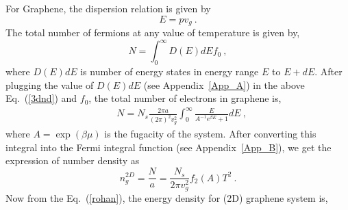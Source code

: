 \documentclass[amsmath,amssymb,aps,prb]{revtex4-2}
\begin{document}
    For Graphene, the dispersion relation is given by
    \begin{equation}
    E = pv_g~.
    \label{nanu}
    \end{equation}
    The total number of fermions at any value of temperature is given by,
    \begin{equation}
    N = \int_0^{\infty}D\left(E\right)dE f_0~,
    \label{3dnd}
    \end{equation}
    where $D\left(E\right)dE$ is number of energy states in energy range $E$ to $E+dE$.
%
    After plugging the value of $D\left(E\right)dE$ (see Appendix~\ref{App_A}) in the above Eq.~(\ref{3dnd}) and $f_0$, the total number of electrons in graphene is,
    \begin{align*}
    &N = N_s \frac{2\pi a}{\left(2\pi\right)^2 v_g^2} \int_{0}^{\infty}  \frac{E}{A^{-1}e^{\beta E} + 1} dE~,
    \end{align*}
    where $A=\exp{(\beta \mu)}$ is the fugacity of the system. After converting this integral into the Fermi integral function (see Appendix~\ref{App_B}), we get the expression of number density as 
    \begin{equation}
    n_g^{2D} = \frac{N}{a} = \frac{N_s}{2 \pi v_g^2} f_2\left(A\right) T^2~.
    \end{equation}
%
    Now from the Eq.~(\ref{rohan}), the energy density for (2D) graphene system is,
\end{document}
